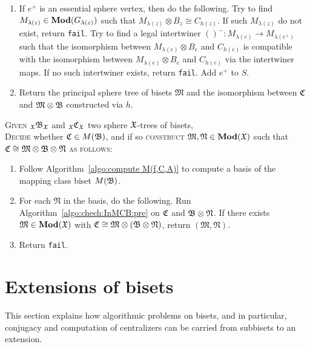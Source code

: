 \documentclass{amsart}
\begin{document}
\begin{algo}
\begin{enumerate}
    intertwiner maps. If it does not exist, return
    \texttt{fail}.
  \item If $e^+$ is an essential sphere vertex, then do the
    following. Try to find $M_{\lambda(z)} \in \mathbf{\relax Mod}(G_{\lambda(z)})$
    such that $M_{\lambda(z)} \otimes B_z \cong C_{h(z)}$. If such
    $M_{\lambda(z)}$ do not exist, return \texttt{fail}. Try to find a
    legal intertwiner $()^-\colon M_{\lambda(e)}\to M_{\lambda(e^+)}$
    such that the isomorphism between $M_{\lambda(e)}\otimes B_{e}$
    and $C_{h(e)}$ is compatible with the isomorphism between
    $M_{\lambda(e)}\otimes B_{e}$ and $C_{h(e)}$ via the
    intertwiner maps. If no such
    intertwiner exists, return
    \texttt{fail}. Add $e^+$ to $S$. \label{algo:chech:InMCB:St6}
  \item Return the principal sphere tree of bisets $\mathfrak M$ and
    the isomorphism between ${\mathfrak C}$ and $\mathfrak M \otimes {\mathfrak B}$
    constructed via $h$.
  \end{enumerate}
\end{algo}

\begin{algo}\label{algo:chech:InMCB}
  \textsc{Given} $\subscript \gf\gfB_\gf$ and $\subscript \gf\gfC_\gf$
  two sphere ${\mathfrak X}$-trees of bisets,\\
  \textsc{Decide} whether ${\mathfrak C}\in M({\mathfrak B})$, and if so
  \textsc{construct} $\mathfrak M, \mathfrak N\in \mathbf{\relax Mod}({\mathfrak X})$
  such that ${\mathfrak C}\cong \mathfrak M \otimes {\mathfrak B} \otimes
  \mathfrak N$ \textsc{as follows:}\\\upshape
  \begin{enumerate}
  \item Follow Algorithm~\ref{algo:compute M(f,C,A)} to compute a
    basis of the mapping class biset $M({\mathfrak B})$.
  \item For each $\mathfrak N$ in the basis, do the following. Run
    Algorithm~\ref{algo:chech:InMCB:pre} on ${\mathfrak C}$ and
    ${\mathfrak B}\otimes\mathfrak N$. If there exists
    $\mathfrak M\in\mathbf{\relax Mod}({\mathfrak X})$ with
    ${\mathfrak C}\cong\mathfrak M\otimes(\mathfrak B\otimes\mathfrak N)$,
    return $(\mathfrak M,\mathfrak N)$.
  \item Return \texttt{fail}.
  \end{enumerate}
\end{algo}

\section{Extensions of bisets}
This section explains how algorithmic problems on bisets, and in
particular, conjugacy and computation of centralizers can be carried
from subbisets to an extension.
\end{document}
